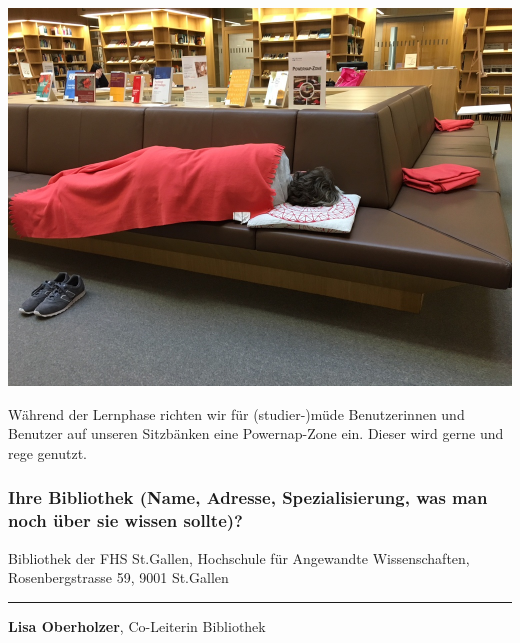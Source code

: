 \begin{center}
\includegraphics{fhs-st-gallen/img/powernap-zone.jpg}
\end{center}

Während der Lernphase richten wir für (studier-)müde Benutzerinnen und
Benutzer auf unseren Sitzbänken eine Powernap-Zone ein. Dieser wird
gerne und rege genutzt.

\hypertarget{ihre-bibliothek-name-adresse-spezialisierung-was-man-noch-uxfcber-sie-wissen-sollte}{%
\subsubsection*{Ihre Bibliothek (Name, Adresse, Spezialisierung, was man noch
über sie wissen
sollte)?}\label{ihre-bibliothek-name-adresse-spezialisierung-was-man-noch-uxfcber-sie-wissen-sollte}}

Bibliothek der FHS St.Gallen, Hochschule für Angewandte Wissenschaften,
Rosenbergstrasse 59, 9001 St.Gallen

\begin{center}\rule{0.5\linewidth}{\linethickness}\end{center}

\textbf{Lisa Oberholzer}, Co-Leiterin Bibliothek

